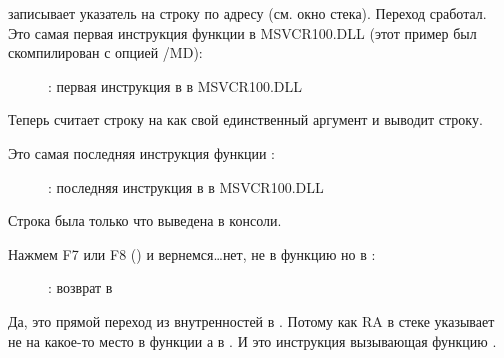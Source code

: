 \clearpage
\MOV записывает указатель на строку по адресу  (см. окно стека).
Переход сработал.
Это самая первая инструкция функции \printf в MSVCR100.DLL (этот пример был скомпилирован с опцией /MD): 

\begin{figure}[H]
\centering
{}
\caption{\olly: первая инструкция в \printf в MSVCR100.DLL}
\label{fig:switch_few_olly6}
\end{figure}

Теперь \printf считает строку на  как свой единственный аргумент и выводит строку.

\clearpage
Это самая последняя инструкция функции \printf:

\begin{figure}[H]
\centering
{}
\caption{\olly: последняя инструкция в \printf в MSVCR100.DLL}
\label{fig:switch_few_olly7}
\end{figure}

Строка  была только что выведена в консоли.

\clearpage
Нажмем F7 или F8 (\stepover) и вернемся\dots нет, не в функцию \ttf но в \main:

\begin{figure}[H]
\centering
{}
\caption{\olly: возврат в \main}
\label{fig:switch_few_olly8}
\end{figure}

Да, это прямой переход из внутренностей \printf в \main.
Потому как \ac{RA} в стеке указывает не на какое-то место в функции \ttf а в \main.
И \CALL {} это инструкция вызывающая функцию \ttf.

